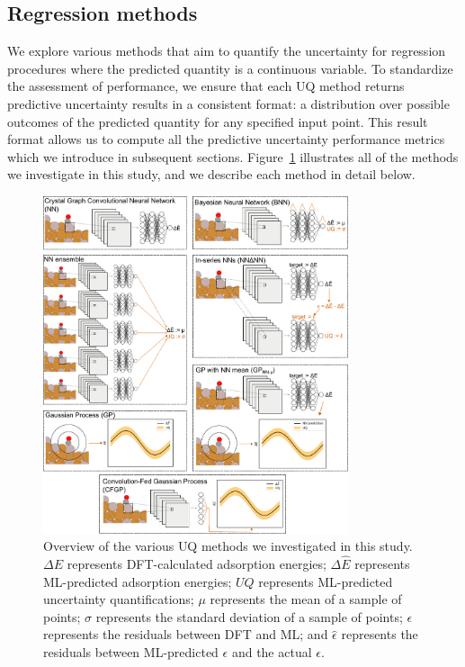 \documentclass[]{achemso}
\begin{document}
\subsection{Regression methods}

We explore various methods that aim to quantify the uncertainty for regression procedures where the predicted quantity is a continuous variable.
To standardize the assessment of performance, we ensure that each \gls{UQ} method returns predictive uncertainty results in a consistent format:  a distribution over possible outcomes of the predicted quantity for any specified input point.
This result format allows us to compute all the predictive uncertainty performance metrics which we introduce in subsequent sections.
Figure~\ref{fig:methods} illustrates all of the methods we investigate in this study, and we describe each method in detail below.

\begin{figure}
    \centering
    \includegraphics[width=0.8\textwidth]{methods/methods.pdf}
    \caption{Overview of the various \gls{UQ} methods we investigated in this study.
    $\Delta E$ represents \gls{DFT}-calculated adsorption energies;
    $\Delta \hat{E}$ represents \gls{ML}-predicted adsorption energies;
    $UQ$ represents \gls{ML}-predicted uncertainty quantifications;
    $\mu$ represents the mean of a sample of points;
    $\sigma$ represents the standard deviation of a sample of points;
    $\epsilon$ represents the residuals between \gls{DFT} and \gls{ML};
    and $\hat{\epsilon}$ represents the residuals between \gls{ML}-predicted $\epsilon$ and the actual $\epsilon$.
    }\label{fig:methods}
\end{figure}
\end{document}

